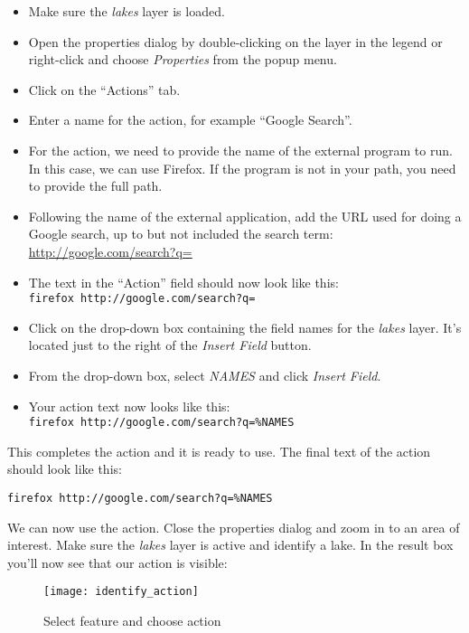 \begin{itemize}
\item Make sure the \textsl{lakes} layer is loaded.
\item Open the properties dialog by double-clicking on the layer in the
  legend or right-click and choose \textsl{Properties} from the popup menu.
\item Click on the ``Actions'' tab.
\item Enter a name for the action, for example ``Google Search''.
\item For the action, we need to provide the name of the external program to
  run. In this case, we can use Firefox. If the program is not in
  your path, you need to provide the full path.
\item Following the name of the external application, add the URL used for
  doing a Google search, up to but not included the search term:
  \url{http://google.com/search?q=}
\item The text in the ``Action'' field should now look like this:\\
  \texttt{firefox http://google.com/search?q=}
\item Click on the drop-down box containing the field names for the
  \textsl{lakes} layer. It's located just to the right of the
  \textsl{Insert Field} button.
\item From the drop-down box, select \textsl{NAMES} and click \textsl{Insert Field}.
\item Your action text now looks like this:\\ \texttt{firefox
  http://google.com/search?q=\%NAMES}
\end{itemize}
 
This completes the action and it is ready to use. The final text of the action
should look like this:

\begin{center}
\texttt{firefox http://google.com/search?q=\%NAMES}
\end{center}

We can now use the action. Close the properties dialog and zoom in to an area
of interest. Make sure the \textsl{lakes} layer is active and identify a
lake. In the result box you'll now see that our action is visible:

\begin{figure}[H]
   \begin{center}
   \caption{Select feature and choose action}\label{fig:identify_action}\smallskip
   \texttt{[image: identify\_action]} 
\end{center}  
\end{figure}

